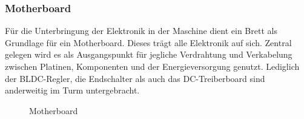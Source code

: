 \subsubsection{Motherboard}
Für die Unterbringung der Elektronik in der Maschine dient ein Brett
als Grundlage für ein Motherboard. Dieses trägt alle Elektronik auf
sich. Zentral gelegen wird es als Ausgangspunkt für jegliche 
Verdrahtung und Verkabelung zwischen Platinen, Komponenten und der
Energieversorgung genutzt. Lediglich der BLDC-Regler, die Endschalter 
als auch das DC-Treiberboard sind anderweitig im Turm untergebracht.

\begin{figure}[h!]
	\centering
	\caption{Motherboard}
\end{figure}
